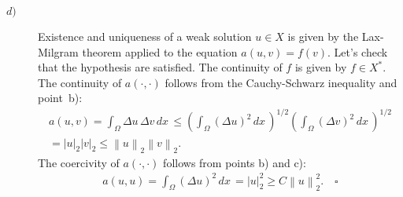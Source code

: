 \documentclass[a4paper]{article}
\newcommand{\dx}{\, dx \,}
\newcommand{\norm}[1]{\left\lVert#1\right\rVert}
\newcommand{\seminorm}[1]{\left\lvert#1\right\rvert}
\begin{document}
\begin{description}
\item[$d)$] Existence and uniqueness of a weak solution $u \in X$ is given by
	the Lax-Milgram theorem applied to the equation $a(u,v)=f(v)$.
	Let's check that the hypothesis are satisfied.
	The continuity of $f$ is given by $f \in X^*$.
	The continuity of $a(\cdot,\cdot)$ follows from the Cauchy-Schwarz inequality
	and point~b):
	\begin{gather*}
	a(u,v)
	= \int_\Omega \Delta u \, \Delta v \dx
	\leq \left( \int_\Omega (\Delta u)^2 \dx \right)^{1/2}
	     \left( \int_\Omega (\Delta v)^2 \dx \right)^{1/2} \\
	= \seminorm{u}_2 \seminorm{v}_2
	\leq \norm{u}_2 \norm{v}_2.
	\end{gather*}
	The coercivity of $a(\cdot,\cdot)$ follows from points b) and c):
	\begin{gather*}
	a(u,u) = \int_\Omega (\Delta u)^2 \dx = \seminorm{u}_2^2 \geq C \norm{u}_2^2. \quad \square
	\end{gather*}
\end{description}
\end{document}
